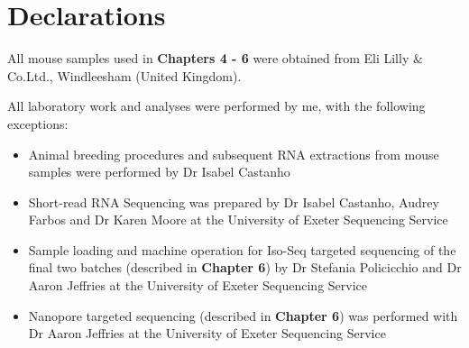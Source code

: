 \chapter*{Declarations}

All mouse samples used in \textbf{Chapters 4 - 6}  were obtained from Eli Lilly \& Co.Ltd., Windleesham (United Kingdom). 

All laboratory work and analyses were performed by me, with the following exceptions:
\begin{itemize}
	\item Animal breeding procedures and subsequent RNA extractions from mouse samples were performed by Dr Isabel Castanho
	\item Short-read RNA Sequencing was prepared by Dr Isabel Castanho, Audrey Farbos and Dr Karen Moore at the University of Exeter Sequencing Service 
	\item Sample loading and machine operation for Iso-Seq targeted sequencing of the final two batches (described in \textbf{Chapter 6}) by Dr Stefania Policicchio and Dr Aaron Jeffries at the University of Exeter Sequencing Service   
	\item Nanopore targeted sequencing (described in \textbf{Chapter 6}) was performed with Dr Aaron Jeffries at the University of Exeter Sequencing Service 	
\end{itemize}